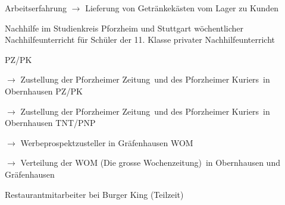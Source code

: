 \begin{rubric}{\textcolor{black!20!blue!100}{Arbeitserfahrung}}
				\setlength{\hangindent}{\widthof{$\rightarrow$ }}
				$\rightarrow$ Lieferung von Getränkekästen vom Lager zu Kunden
					
			\entry*[10/2015 --- 01/2016]
				Nachhilfe im Studienkreis Pforzheim und Stuttgart
			\entry*[10/2011 --- 06/2012]
				wöchentlicher Nachhilfeunterricht für Schüler der 11. Klasse
			\entry*[\phantom{10/}2010 --- 2016]
				privater Nachhilfeunterricht
				
			\entry*[08/2015 --- 09/2015]
				PZ/PK
				
				\setlength{\hangindent}{\widthof{$\rightarrow$ }}
				$\rightarrow$ Zustellung der \glqq Pforzheimer Zeitung\grqq\ und des \glqq Pforzheimer Kuriers\grqq\ in Obernhausen
			\entry*[08/2012 --- 09/2012]
				PZ/PK
				
				\setlength{\hangindent}{\widthof{$\rightarrow$ }}
				$\rightarrow$ Zustellung der \glqq Pforzheimer Zeitung\grqq\ und des \glqq Pforzheimer Kuriers\grqq\ in Obernhausen
			\entry*[06/2009 --- 10/2010]
				TNT/PNP
				
				\setlength{\hangindent}{\widthof{$\rightarrow$ }}
				$\rightarrow$ Werbeprospektzusteller in Gräfenhausen
			\entry*[06/2007 --- 12/2008]
				WOM
				
				\setlength{\hangindent}{\widthof{$\rightarrow$ }}
				$\rightarrow$ Verteilung der \glqq WOM (Die grosse Wochenzeitung)\grqq\ in Obernhausen und Gräfenhausen
				
			\entry*[04/2012 --- 10/2012]
				Restaurantmitarbeiter bei Burger King (Teilzeit)
	\end{rubric}